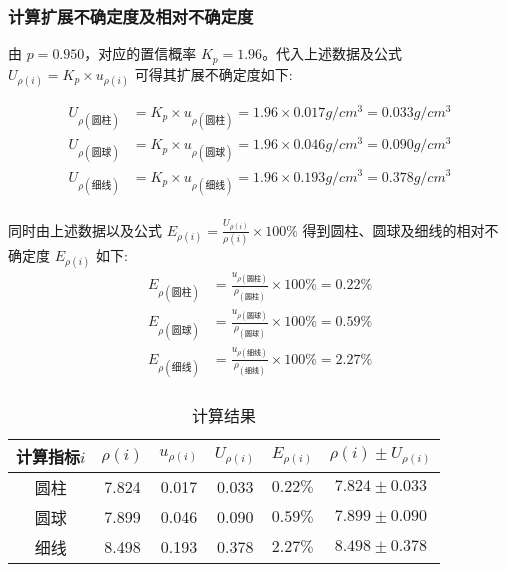 \documentclass[UTF8]{ctexart}
\begin{document}
\subsubsection{计算扩展不确定度及相对不确定度}
\begin{spacing}{1.2}
    由 $p=0.950$，对应的置信概率 $K_p=1.96$。代入上述数据及公式 $U_{\rho(i)} = K_p \times u_{\rho(i)}$ 可得其扩展不确定度如下:
\end{spacing}
\begin{align*}
    U_{\rho(\text{圆柱})} &= K_p \times u_{\rho(\text{圆柱})} = 1.96 \times 0.017 g/cm^3 = 0.033 g/cm^3\\
    U_{\rho(\text{圆球})} &= K_p \times u_{\rho(\text{圆球})} = 1.96 \times 0.046 g/cm^3 = 0.090 g/cm^3\\
    U_{\rho(\text{细线})} &= K_p \times u_{\rho(\text{细线})} = 1.96 \times 0.193 g/cm^3 = 0.378 g/cm^3 \\
\end{align*}

同时由上述数据以及公式 $E_{\rho(i)} = \frac{U_{\rho(i)}}{\rho(i)} \times 100\%$ 得到圆柱、圆球及细线的相对不确定度 $E_{\rho(i)}$ 如下:
\begin{align*}
    E_{\rho(\text{圆柱})} &= \frac{u_{\rho(\text{圆柱})}}{\rho_{(\text{圆柱})}} \times 100 \%=  0.22\%\\
    E_{\rho(\text{圆球})} &= \frac{u_{\rho(\text{圆球})}}{\rho_{(\text{圆球})}} \times 100 \%=   0.59\%\\
    E_{\rho(\text{细线})} &= \frac{u_{\rho(\text{细线})}}{\rho_{(\text{细线})}} \times 100 \%=  2.27\%\\
\end{align*}


\begin{table}[H]
\centering
\caption*{计算结果}
\begin{tabular}{c|c|c|c|c|c}
\toprule[1pt]
\midrule
     计算指标$i$& $\rho(i) $ & $u_{\rho(i)}$ & $U_{\rho(i)}$& $E_{\rho(i)}$ & $\rho(i) \pm U_{\rho(i)}$  \\
\midrule
      圆柱 & 7.824 & 0.017 & 0.033 & $0.22\%$& $7.824 \pm 0.033$ \\
\midrule
     圆球 &  7.899& 0.046 &  0.090& $0.59\%$& $7.899 \pm 0.090$\\
\midrule
     细线 & 8.498 & 0.193 &  0.378 &$2.27\%$ &$8.498 \pm 0.378$\\
\midrule
\bottomrule[1pt]
\end{tabular}
\end{table}
\end{document}

